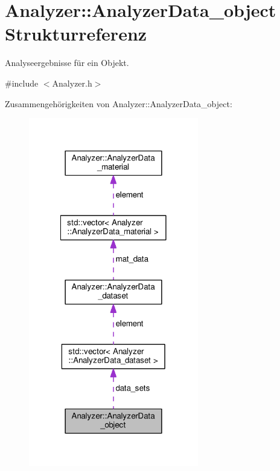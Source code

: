 \hypertarget{structAnalyzer_1_1AnalyzerData__object}{\section{Analyzer\-:\-:Analyzer\-Data\-\_\-object Strukturreferenz}
\label{structAnalyzer_1_1AnalyzerData__object}
}


Analyseergebnisse für ein Objekt.  




{\ttfamily \#include $<$Analyzer.\-h$>$}



Zusammengehörigkeiten von Analyzer\-:\-:Analyzer\-Data\-\_\-object\-:
\nopagebreak
\begin{figure}[H]
\begin{center}
\leavevmode
\includegraphics[width=210pt]{structAnalyzer_1_1AnalyzerData__object__coll__graph}
\end{center}
\end{figure}
